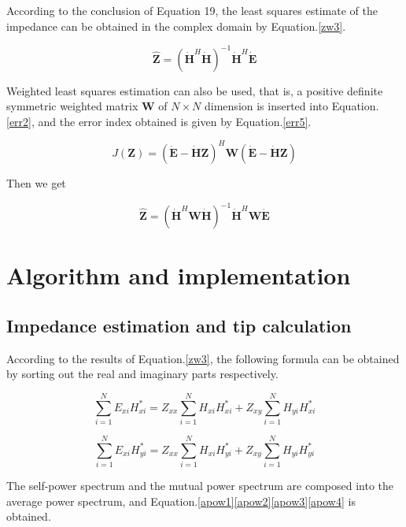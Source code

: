 \documentclass[9pt,a4paper,twoside]{rho-class/rho}
\begin{document}
According to the conclusion of Equation 19, the least squares estimate of the impedance can be obtained in the complex domain by Equation.\eqref{zw3}.

\begin{equation}
    \label{zw3}
    \hat{\bm{Z}} = (\dot{\mathbf{H}}^H \dot{\mathbf{H}})^{-1}\dot{\mathbf{H}}^H\dot{\bm{E}}
\end{equation}

Weighted least squares estimation can also be used, that is, a positive definite symmetric weighted matrix $\mathbf{W}$ of $N \times N$ dimension is inserted into Equation.\eqref{err2}, and the error index obtained is given by Equation.\eqref{err5}.

\begin{equation}
    \label{err5}
    J(\bm{Z})=(\dot{\bm{E}}-\dot{\mathbf{H}}\bm{Z})^H\mathbf{W}(\dot{\bm{E}}-\dot{\mathbf{H}}\bm{Z})
\end{equation}

Then we get

\begin{equation}
    \label{zw4}
    \hat{\bm{Z}}=(\dot{\mathbf{H}}^H \mathbf{W} \dot{\mathbf{H}})^{-1}\dot{\mathbf{H}}^H\mathbf{W}\dot{\bm{E}}
\end{equation}

\section{Algorithm and implementation}

\subsection{Impedance estimation and tip calculation}

According to the results of Equation.\eqref{zw3}, the following formula can be obtained by sorting out the real and imaginary parts respectively.

\begin{equation}
    \label{pow1}
    \sum^N_{i=1}E_{xi}H_{xi}^\ast=Z_{xx}\sum^{N}_{i=1}H_{xi}H_{xi}^\ast+Z_{xy}\sum^N_{i=1}H_{yi}H_{xi}^\ast
\end{equation}

\begin{equation}
    \label{pow2}
    \sum^N_{i=1}E_{xi}H_{yi}^\ast=Z_{xx}\sum^N_{i=1}H_{xi}H_{yi}^\ast+Z_{xy}\sum^N_{i=1}H_{yi}H_{yi}^\ast
\end{equation}

The self-power spectrum and the mutual power spectrum are composed into the average power spectrum, and Equation.\eqref{apow1}\eqref{apow2}\eqref{apow3}\eqref{apow4} is obtained.
\end{document}
